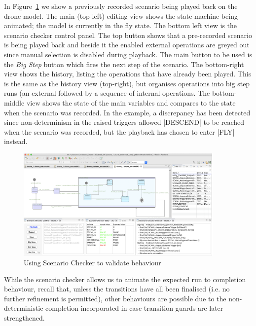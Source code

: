 In Figure~\ref{fig:scenarioChecker} we show a previously recorded scenario being played back on the drone model.
The main (top-left) editing view shows the state-machine being animated; the model is currently in the fly state.
The bottom left view is the scenario checker control panel.
The top button shows that a pre-recorded scenario is being played back and beside it the enabled external operations are greyed out since manual selection is disabled during playback.
The main button to be used is the \emph{Big Step} button which fires the next step of the scenario.
The bottom-right view shows the history, listing the operations that have already been played.
This is the same as the \PROB history view (top-right), but organises operations into big step runs (an external followed by a sequence of internal operations.
The bottom-middle view shows the state of the main variables and compares to the state when the scenario was recorded.
In the example, a discrepancy has been detected since non-determinism in the raised triggers allowed |DESCEND| to be reached when the scenario was recorded, but the playback has chosen to enter |FLY| instead.


\begin{figure}[!h]
	\centering
	\includegraphics[width=0.90\textwidth, trim=30 50 60 0]{figures/scenarioChecker.png}
	\caption{Using Scenario Checker to validate behaviour}
	\label{fig:scenarioChecker}
\end{figure}

While the scenario checker allows us to animate the expected run to completion behaviour, recall that, unless the transitions have all been finalised (i.e. no further refinement is permitted),  other behaviours are possible due to the non-deterministic completion incorporated in case transition guards are later strengthened. 
 


